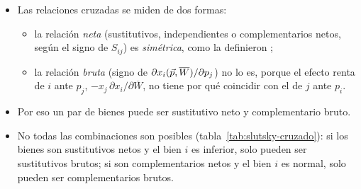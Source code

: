 \documentclass[11pt]{article}
\begin{document}
\begin{itemize}
\item Las relaciones cruzadas se miden de dos formas:
  \begin{itemize}
  \item la relación \emph{neta} (sustitutivos, independientes o complementarios netos, según el signo de $S_{ij}$) es \emph{simétrica}, como la definieron \textcite{HicksAllen1934Reconsideration};
  \item la relación \emph{bruta} (signo de $\partial x_i(\vec{p},\overline{W})/\partial p_j$) no lo es, porque el efecto renta de $i$ ante $p_j$, $-x_j\,\partial x_i/\partial\overline{W}$, no tiene por qué coincidir con el de $j$ ante $p_i$.
  \end{itemize}
\item Por eso un par de bienes puede ser sustitutivo neto y complementario bruto.
\item No todas las combinaciones son posibles (tabla~\ref{tab:slutsky-cruzado}): si los bienes son sustitutivos netos y el bien $i$ es inferior, solo pueden ser sustitutivos brutos; si son complementarios netos y el bien $i$ es normal, solo pueden ser complementarios brutos.
\end{itemize}
\end{document}
